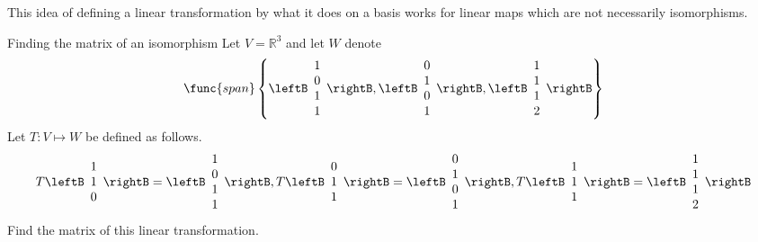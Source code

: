This idea of defining a linear transformation by what it does on a basis
works for linear maps which are not necessarily isomorphisms.

\begin{example}{Finding the matrix of an isomorphism}{}
Let $V=\mathbb{R}^{3}$ and let $W$ denote 
\begin{equation*}
\func{span}\left\{ \leftB
\begin{array}{c}
1 \\ 
0 \\ 
1 \\ 
1
\end{array}
\rightB ,\leftB 
\begin{array}{c}
0 \\ 
1 \\ 
0 \\ 
1
\end{array}
\rightB ,\leftB 
\begin{array}{c}
1 \\ 
1 \\ 
1 \\ 
2
\end{array}
\rightB \right\}
\end{equation*}
Let $T: V \mapsto W$ be defined as follows. 
\begin{equation*}
T\leftB 
\begin{array}{c}
1 \\ 
1 \\ 
0
\end{array}
\rightB = \leftB 
\begin{array}{c}
1 \\ 
0 \\ 
1 \\ 
1
\end{array}
\rightB ,T\leftB 
\begin{array}{c}
0 \\ 
1 \\ 
1
\end{array}
\rightB =\leftB 
\begin{array}{c}
0 \\ 
1 \\ 
0 \\ 
1
\end{array}
\rightB ,T\leftB 
\begin{array}{c}
1 \\ 
1 \\ 
1
\end{array}
\rightB =\leftB 
\begin{array}{c}
1 \\ 
1 \\ 
1 \\ 
2
\end{array}
\rightB
\end{equation*}
 Find the matrix of this linear transformation.
\end{example}

